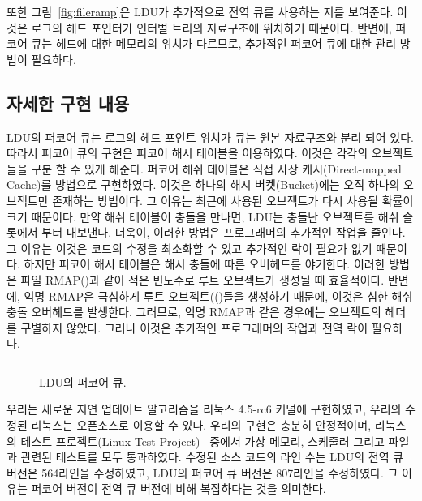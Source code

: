 또한 그림~\ref{fig:fileramp}은 LDU가 추가적으로 전역 큐를 사용하는 지를 보여준다. 
이것은 로그의 헤드 포인터가 인터벌 트리의 자료구조에 위치하기 때문이다.
반면에, 퍼코어 큐는 헤드에 대한 메모리의 위치가 다르므로, 추가적인 퍼코어 큐에 대한 관리 방법이 필요하다. 

\subsection{자세한 구현 내용}
LDU의 퍼코어 큐는 로그의 헤드 포인트 위치가 큐는 원본 자료구조와 분리 되어 있다.
따라서 퍼코어 큐의 구현은 퍼코어 해시 테이블을 이용하였다. 
이것은 각각의 오브젝트들을 구분 할 수 있게 해준다.
퍼코어 해쉬 테이블은 직접 사상 캐시(Direct-mapped Cache)를 방법으로 구현하였다. 
이것은 하나의 해시 버켓(Bucket)에는 오직 하나의 오브젝트만 존재하는 방법이다.
그 이유는 최근에 사용된 오브젝트가 다시 사용될 확률이 크기 때문이다. 
만약 해쉬 테이블이 충돌을 만나면, LDU는 충돌난 오브젝트를 해쉬 슬롯에서 부터 내보낸다.
더욱이, 이러한 방법은 프로그래머의 추가적인 작업을 줄인다. 
그 이유는 이것은 코드의 수정을 최소화할 수 있고 추가적인 락이 필요가 없기 때문이다.
하지만 퍼코어 해시 테이블은 해시 충돌에 따른 오버헤드를 야기한다.
이러한 방법은 파일 RMAP()과 같이 적은 빈도수로 루트 
오브젝트가 생성될 때 효율적이다. 
반면에, 익명 RMAP은 극심하게 루트 오브젝트(()들을 생성하기 때문에, 
이것은 심한 해쉬 충돌 오버헤드를 발생한다. 
그러므로, 익명 RMAP과 같은 경우에는 오브젝트의 헤더를 구별하지 않았다. 
그러나 이것은 추가적인 프로그래머의 작업과 전역 락이 필요하다.

\begin{figure}[h!]
\begin{center}
\inputminted[linenos,fontsize=\footnotesize,
tabsize=4]{c}{src/ldu_queue_per_core.c}
\end{center}
\caption{LDU의 퍼코어 큐.}
\label{fig:glduphysicalupdate}
\end{figure}

우리는 새로운 지연 업데이트 알고리즘을 리눅스 4.5-rc6 커널에 구현하였고, 우리의 
수정된 리눅스는 오픈소스로 이용할 수 있다.  
우리의 구현은 충분히 안정적이며, 리눅스의 테스트 
프로젝트(Linux Test Project)~\cite{LTP} 중에서 가상 메모리, 스케줄러 그리고 
파일과 관련된 테스트를 모두 통과하였다. 
수정된 소스 코드의 라인 수는 LDU의 전역 큐 버전은 564라인을 수정하였고, 
LDU의 퍼코어 큐 버전은 807라인을 수정하였다. 
그 이유는 퍼코어 버전이 전역 큐 버전에 비해 복잡하다는 것을 의미한다.


